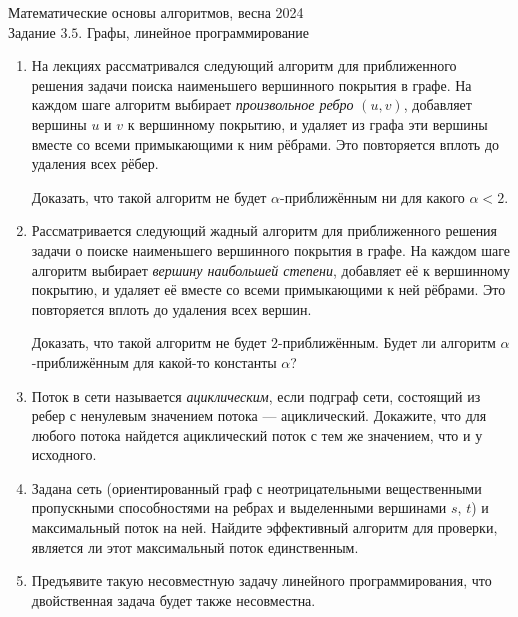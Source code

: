 \documentclass[11pt]{article}
\newenvironment{exercise}{\item}{}
\begin{document}
\begin{center}
	\Large Математические основы алгоритмов, весна 2024 \\
	\Large Задание \(3.5\). Графы, линейное программирование
\end{center}


\begin{enumerate}
\begin{exercise}
На лекциях рассматривался следующий алгоритм
для приближенного решения задачи
поиска наименьшего вершинного покрытия в графе. %
На каждом шаге алгоритм выбирает \emph{произвольное ребро} $(u,v)$,
добавляет вершины $u$ и $v$ к вершинному покрытию,
и удаляет из графа эти вершины вместе со всеми примыкающими к ним рёбрами.
Это повторяется вплоть до удаления всех рёбер.

Доказать, что такой алгоритм не будет $\alpha$-приближённым ни для какого $\alpha < 2$.
\end{exercise}

	
\begin{exercise}
Рассматривается следующий жадный алгоритм
для приближенного решения задачи
о поиске наименьшего вершинного покрытия в графе. %
На каждом шаге алгоритм выбирает \emph{вершину наибольшей степени},
добавляет её к вершинному покрытию,
и удаляет её вместе со всеми примыкающими к ней рёбрами.
Это повторяется вплоть до удаления всех вершин.

Доказать, что такой алгоритм не будет $2$-приближённым.
Будет ли алгоритм $\alpha$-приближённым для какой-то константы $\alpha$?
\end{exercise}


\begin{exercise}
Поток в сети называется \emph{ациклическим}, если подграф сети, 
состоящий из ребер с ненулевым значением потока --- ациклический.
Докажите, что для любого потока найдется ациклический поток с тем же значением, что и у исходного.
\end{exercise}


\begin{exercise}
Задана сеть 
(ориентированный граф с неотрицательными вещественными пропускными способностями на ребрах
и выделенными вершинами $s$, $t$)
и максимальный поток на ней.
Найдите эффективный алгоритм для проверки, является ли этот максимальный поток единственным.
\end{exercise}


\begin{exercise}
Предъявите такую несовместную задачу линейного программирования, что двойственная задача будет также несовместна.
\end{exercise}



\end{enumerate}
\end{document}
